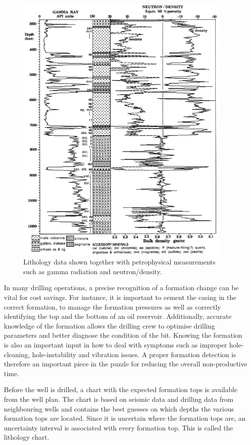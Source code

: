 \begin{figure}
\begin{center}
\includegraphics [keepaspectratio,width = 10.7cm] {figures/VT_lithologyGamma.png}
\caption{Lithology data shown together with petrophysical measurements such as gamma radiation and neutron/density.}
\label{lithology}
\end{center}
\end{figure}

In many drilling operations, a precise recognition of a formation change can be vital for cost savings. 
For instance, it is important to cement the casing in the correct formation, to manage the formation pressures as well as correctly identifying the top and the bottom of an oil reservoir. 
Additionally, accurate knowledge of the formation allows the drilling crew to optimise drilling parameters and better diagnose the condition of the bit. 
Knowing the formation is also an important input in how to deal with symptoms such as improper hole-cleaning, hole-instability and vibration issues. 
A proper formation detection is therefore an important piece in the puzzle for reducing the overall non-productive time.

Before the well is drilled, a chart with the expected formation tops is available from the well plan. The chart is based on seismic data and drilling data from neighbouring wells and contains the best guesses on which depths the various formation tops are located. Since it is uncertain where the formation tops are, an uncertainty interval is associated with every formation top. This is called the lithology chart. 

